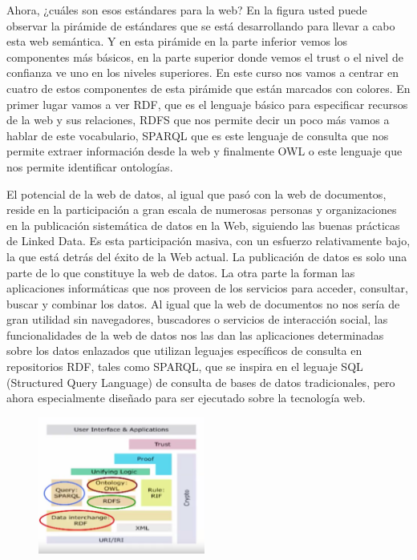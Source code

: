 Ahora, ¿cuáles son esos estándares para la web? En la figura usted puede observar la pirámide de estándares que se está desarrollando para llevar a cabo esta web semántica. Y en esta pirámide en la parte inferior vemos los componentes más básicos, en la parte superior donde vemos el trust o el nivel de confianza ve uno en los niveles superiores. En este curso nos vamos a centrar en cuatro de estos componentes de esta pirámide que están marcados con colores. En primer lugar vamos a ver RDF, que es el lenguaje básico para especificar recursos de la web y sus relaciones, RDFS que nos permite decir un poco más vamos a hablar de este vocabulario, SPARQL que es este lenguaje de consulta que nos permite extraer información desde la web y finalmente OWL o este lenguaje que nos permite identificar ontologías.


El potencial de la web de datos, al igual que pasó con la web de documentos, reside en la participación a gran escala de numerosas personas y organizaciones en la publicación sistemática de datos en la Web, siguiendo las buenas prácticas de Linked Data. Es esta participación masiva, con un esfuerzo relativamente bajo, la que está detrás del éxito de la Web actual. La publicación de datos es solo una parte de lo que constituye la web de datos. La otra parte la forman las aplicaciones informáticas que nos proveen de los servicios para acceder, consultar, buscar y combinar los datos. Al igual que la web de documentos no nos sería de gran utilidad sin navegadores, buscadores o servicios de interacción social, las funcionalidades de la web de datos nos las dan las aplicaciones determinadas sobre los datos enlazados que utilizan leguajes específicos de consulta en repositorios RDF, tales como SPARQL, que se inspira en el leguaje SQL (Structured Query Language) de consulta de bases de datos tradicionales, pero ahora especialmente diseñado para ser ejecutado sobre la tecnología web. %


 \begin{figure}[H]
	\centering
	\includegraphics[height=4.5cm]{imagenes/capitulo3/9}
	\caption{}
\end{figure}

